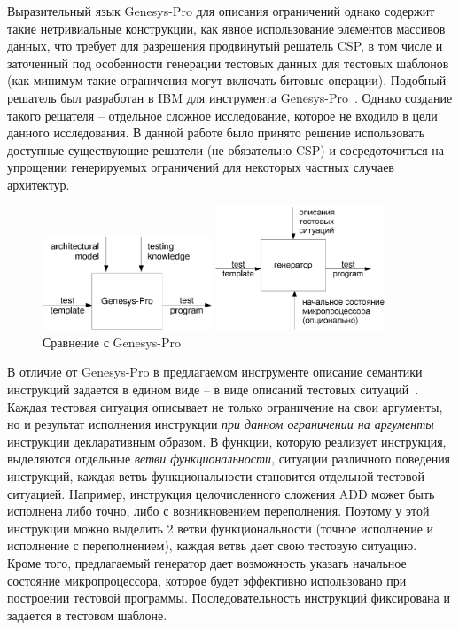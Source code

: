 \documentclass[14pt]{extreport}
\begin{document}
Выразительный язык Genesys-Pro для описания ограничений однако
содержит такие нетривиальные конструкции, как явное использование
элементов массивов данных, что требует для разрешения продвинутый
решатель CSP, в том числе и заточенный под особенности генерации
тестовых данных для тестовых шаблонов (как минимум такие ограничения
могут включать битовые операции). Подобный решатель был разработан в
IBM для инструмента Genesys-Pro~\cite{GenesysSolver}. Однако
создание такого решателя -- отдельное сложное исследование, которое
не входило в цели данного исследования. В данной работе было принято
решение использовать доступные существующие решатели (не обязательно
CSP) и сосредоточиться на упрощении генерируемых ограничений для
некоторых частных случаев архитектур.

\begin{figure}[h]
\parbox{0.5\textwidth}{ \centering
  \includegraphics[width=0.45\textwidth]{3.impl/genesys-pro}
} \vline
\parbox{0.5\textwidth}{ \centering
  \includegraphics[width=0.45\textwidth]{3.impl/mygen}
}
\caption{Сравнение с Genesys-Pro}\label{comparison_genesyspro}
\end{figure}

В отличие от Genesys-Pro в предлагаемом инструменте описание
семантики инструкций задается в едином виде -- в виде описаний
тестовых ситуаций~\cite{my_syrcose_2008, my_isp_2008}. Каждая
тестовая ситуация описывает не только ограничение на свои аргументы,
но и результат исполнения инструкции \emph{при данном ограничении на
аргументы} инструкции декларативным образом. В функции, которую
реализует инструкция, выделяются отдельные \emph{ветви
функциональности}, ситуации различного поведения инструкций, каждая
ветвь функциональности становится отдельной тестовой ситуацией.
Например, инструкция целочисленного сложения ADD может быть
исполнена либо точно, либо с возникновением переполнения. Поэтому у
этой инструкции можно выделить 2 ветви функциональности (точное
исполнение и исполнение с переполнением), каждая ветвь дает свою
тестовую ситуацию. Кроме того, предлагаемый генератор дает
возможность указать начальное состояние микропроцессора, которое
будет эффективно использовано при построении тестовой программы.
Последовательность инструкций фиксирована и задается в тестовом
шаблоне.
\end{document}
